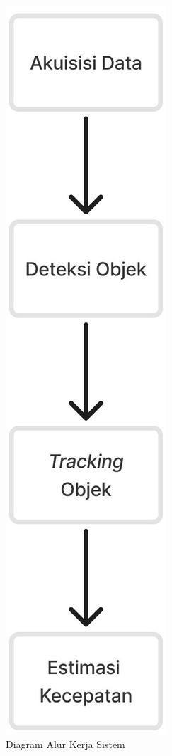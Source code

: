 \begin{figure} [H] \centering
  \includegraphics[scale=0.45]{bab3/diagramsistem.jpg}
  \caption{Diagram Alur Kerja Sistem}
  \label{fig:diagramsistem}
\end{figure}

